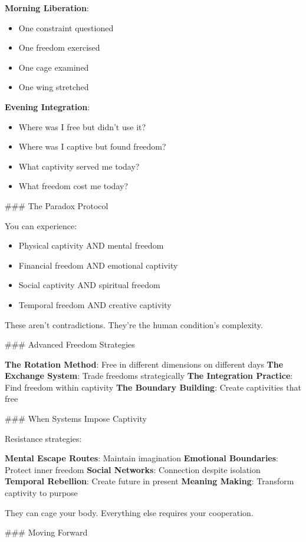 \documentclass[12pt]{book}
\begin{document}
\textbf{Morning Liberation}:
\begin{itemize}
\item One constraint questioned
\item One freedom exercised
\item One cage examined
\item One wing stretched

\end{itemize}
\textbf{Evening Integration}:
\begin{itemize}
\item Where was I free but didn't use it?
\item Where was I captive but found freedom?
\item What captivity served me today?
\item What freedom cost me today?

\end{itemize}
\#\#\# The Paradox Protocol

You can experience:
\begin{itemize}
\item Physical captivity AND mental freedom
\item Financial freedom AND emotional captivity
\item Social captivity AND spiritual freedom
\item Temporal freedom AND creative captivity

\end{itemize}
These aren't contradictions. They're the human condition's complexity.

\#\#\# Advanced Freedom Strategies

\textbf{The Rotation Method}: Free in different dimensions on different days
\textbf{The Exchange System}: Trade freedoms strategically
\textbf{The Integration Practice}: Find freedom within captivity
\textbf{The Boundary Building}: Create captivities that free

\#\#\# When Systems Impose Captivity

Resistance strategies:

\textbf{Mental Escape Routes}: Maintain imagination
\textbf{Emotional Boundaries}: Protect inner freedom
\textbf{Social Networks}: Connection despite isolation
\textbf{Temporal Rebellion}: Create future in present
\textbf{Meaning Making}: Transform captivity to purpose

They can cage your body. Everything else requires your cooperation.

\#\#\# Moving Forward
\end{document}
